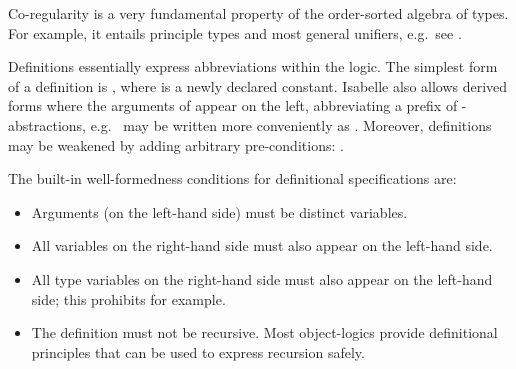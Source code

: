 \begin{isabellebody}
\begin{isamarkuptext}
  \medskip Co-regularity is a very fundamental property of the
  order-sorted algebra of types.  For example, it entails principle
  types and most general unifiers, e.g.\ see \cite{nipkow-prehofer}.%
\end{isamarkuptext}%
\isamarkuptrue%
%
\isamarkuptrue%
%
\begin{isamarkuptext}%
Definitions essentially express abbreviations within the logic.  The
  simplest form of a definition is , where  is a newly declared constant.  Isabelle also allows derived forms
  where the arguments of  appear on the left, abbreviating a
  prefix of \isa{{\isasymlambda}}-abstractions, e.g.\  may be
  written more conveniently as .  Moreover,
  definitions may be weakened by adding arbitrary pre-conditions:
  .

  \medskip The built-in well-formedness conditions for definitional
  specifications are:

  \begin{itemize}

  \item Arguments (on the left-hand side) must be distinct variables.

  \item All variables on the right-hand side must also appear on the
  left-hand side.

  \item All type variables on the right-hand side must also appear on
  the left-hand side; this prohibits  for example.

  \item The definition must not be recursive.  Most object-logics
  provide definitional principles that can be used to express
  recursion safely.

  \end{itemize}


\end{isamarkuptext}
\end{isabellebody}
